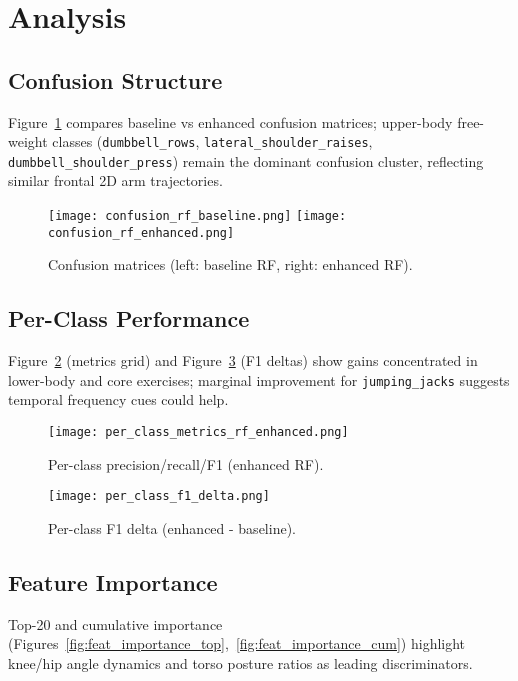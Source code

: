 \documentclass[conference]{IEEEtran}
\newcommand{\code}[1]{\texttt{#1}}
\begin{document}
\section{Analysis}
\subsection{Confusion Structure}
Figure~\ref{fig:confusions} compares baseline vs enhanced confusion matrices; upper-body free-weight classes (\code{dumbbell\_rows}, \code{lateral\_shoulder\_raises}, \code{dumbbell\_shoulder\_press}) remain the dominant confusion cluster, reflecting similar frontal 2D arm trajectories.

\begin{figure}[t]
  \centering
  \texttt{[image: confusion\_rf\_baseline.png]}\hfill
  \texttt{[image: confusion\_rf\_enhanced.png]}
  \caption{Confusion matrices (left: baseline RF, right: enhanced RF).}
  \label{fig:confusions}
\end{figure}

\subsection{Per-Class Performance}
Figure~\ref{fig:per_class_metrics} (metrics grid) and Figure~\ref{fig:f1_delta} (F1 deltas) show gains concentrated in lower-body and core exercises; marginal improvement for \code{jumping\_jacks} suggests temporal frequency cues could help.

\begin{figure}[t]
  \centering
  \texttt{[image: per\_class\_metrics\_rf\_enhanced.png]}
  \caption{Per-class precision/recall/F1 (enhanced RF).}
  \label{fig:per_class_metrics}
\end{figure}

\begin{figure}[t]
  \centering
  \texttt{[image: per\_class\_f1\_delta.png]}
  \caption{Per-class F1 delta (enhanced - baseline).}
  \label{fig:f1_delta}
\end{figure}

\subsection{Feature Importance}
Top-20 and cumulative importance (Figures~\ref{fig:feat_importance_top},~\ref{fig:feat_importance_cum}) highlight knee/hip angle dynamics and torso posture ratios as leading discriminators.
\end{document}
